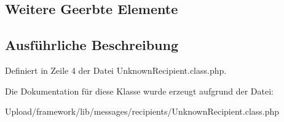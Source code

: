 \subsection*{Weitere Geerbte Elemente}


\subsection{Ausführliche Beschreibung}


Definiert in Zeile 4 der Datei Unknown\+Recipient.\+class.\+php.



Die Dokumentation für diese Klasse wurde erzeugt aufgrund der Datei\+:\begin{DoxyCompactItemize}
\item 
Upload/framework/lib/messages/recipients/Unknown\+Recipient.\+class.\+php\end{DoxyCompactItemize}
